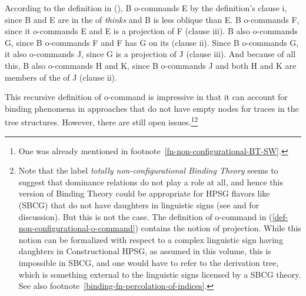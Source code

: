 \documentclass[output=paper,biblatex,babelshorthands,newtxmath,draftmode,colorlinks,citecolor=brown]{langscibook}
\begin{document}
\largerpage
According to the definition in (), B o-commands E by the definition's clause i, since B and E are in the \argstl of
\emph{thinks} and B is less oblique than E. B o-commands F, since it o-commands E and E
is a projection of F (clause iii). B also o-commands G, since B o-commands F and F has G on its
\argstl (clause ii). Since B o-commands G, it also o-commands J, since G is a projection of J
(clause iii). And because of all this, B also o-commands H and K, since B o-commands J and both H and
K are members of the \argstl of J (clause ii). 

This recursive definition of o-command is impressive in that it can account for binding phenomena
in approaches that do not have empty nodes for traces in the tree structures. However, there are still open
issues.\footnote{
One was already mentioned in footnote~\ref{fn-non-configurational-BT-SW}.
}\footnote{%
Note that the label \emph{totally non-configurational Binding Theory} seems to suggest that
dominance relations do not play a role at all, and hence this version of Binding Theory could be appropriate for
HPSG flavors like \sbcg (SBCG) that do not have daughters in linguistic signs (see \citealt{Sag2012a} and
 for discussion). But this is not the case. The definition of o-command in
(\ref{def-non-configurational-o-command}) contains the notion of projection. While this notion can
be formalized with respect to a complex linguistic sign having daughters in Constructional HPSG, as
assumed in this volume, this is impossible in SBCG, and one would have to refer to the derivation
tree, which is something external to the linguistic signs licensed by a SBCG theory. See also footnote~\ref{binding-fn-percolation-of-indices}.%
}
\end{document}
